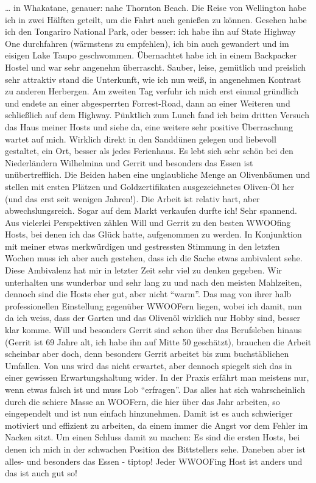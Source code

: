 \ldots{} in Whakatane, genauer: nahe Thornton Beach. Die Reise von
Wellington habe ich in zwei Hälften geteilt, um die Fahrt auch genießen
zu können. Gesehen habe ich den Tongariro National Park, oder besser:
ich habe ihn auf State Highway One durchfahren (wärmstens zu empfehlen),
ich bin auch gewandert und im eisigen Lake Taupo geschwommen.
Übernachtet habe ich in einem Backpacker Hostel und war sehr angenehm
überrascht. Sauber, leise, gemütlich und preislich sehr attraktiv stand
die Unterkunft, wie ich nun weiß, in angenehmen Kontrast zu anderen
Herbergen. Am zweiten Tag verfuhr ich mich erst einmal gründlich und
endete an einer abgesperrten Forrest-Road, dann an einer Weiteren und
schließlich auf dem Highway. Pünktlich zum Lunch fand ich beim dritten
Versuch das Haus meiner Hosts und siehe da, eine weitere sehr positive
Überraschung wartet auf mich. Wirklich direkt in den Sanddünen gelegen
und liebevoll gestaltet, ein Ort, besser als jedes Ferienhaus. Es lebt
sich sehr schön bei den Niederländern Wilhelmina und Gerrit und
besonders das Essen ist unübertrefflich. Die Beiden haben eine
unglaubliche Menge an Olivenbäumen und stellen mit ersten Plätzen und
Goldzertifikaten ausgezeichnetes Oliven-Öl her (und das erst seit
wenigen Jahren!). Die Arbeit ist relativ hart, aber abwechslungsreich.
Sogar auf dem Markt verkaufen durfte ich! Sehr spannend. Aus vielerlei
Perspektiven zählen Will und Gerrit zu den besten WWOOfing Hosts, bei
denen ich das Glück hatte, aufgenommen zu werden. In Konjunktion mit
meiner etwas merkwürdigen und gestressten Stimmung in den letzten Wochen
muss ich aber auch gestehen, dass ich die Sache etwas ambivalent sehe.
Diese Ambivalenz hat mir in letzter Zeit sehr viel zu denken gegeben.
Wir unterhalten uns wunderbar und sehr lang zu und nach den meisten
Mahlzeiten, dennoch sind die Hosts eher gut, aber nicht ``warm''. Das
mag von ihrer halb professionellen Einstellung gegenüber WWOOFern
liegen, wobei ich damit, nun da ich weiss, dass der Garten und das
Olivenöl wirklich nur Hobby sind, besser klar komme. Will und besonders
Gerrit sind schon über das Berufsleben hinaus (Gerrit ist 69 Jahre alt,
ich habe ihn auf Mitte 50 geschätzt), brauchen die Arbeit scheinbar aber
doch, denn besonders Gerrit arbeitet bis zum buchstäblichen Umfallen.
Von uns wird das nicht erwartet, aber dennoch spiegelt sich das in einer
gewissen Erwartungshaltung wider. In der Praxis erfährt man meistens
nur, wenn etwas falsch ist und muss Lob ``erfragen''. Das alles hat sich
wahrscheinlich durch die schiere Masse an WOOFern, die hier über das
Jahr arbeiten, so eingependelt und ist nun einfach hinzunehmen. Damit
ist es auch schwieriger motiviert und effizient zu arbeiten, da einem
immer die Angst vor dem Fehler im Nacken sitzt. Um einen Schluss damit
zu machen: Es sind die ersten Hosts, bei denen ich mich in der schwachen
Position des Bittstellers sehe. Daneben aber ist alles- und besonders
das Essen - tiptop! Jeder WWOOFing Host ist anders und das ist auch gut
so!

